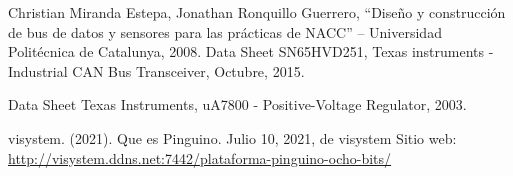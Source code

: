 \begin{thebibliography}{99}
 Christian Miranda Estepa, Jonathan Ronquillo Guerrero, “Diseño y construcción de bus de datos y sensores para las prácticas de NACC” – Universidad Politécnica de Catalunya, 2008.
 Data Sheet SN65HVD251, Texas instruments - Industrial CAN Bus Transceiver, Octubre, 2015. 

 Data Sheet Texas Instruments, uA7800 - Positive-Voltage Regulator, 2003. 

 visystem. (2021). Que es Pinguino. Julio 10, 2021, de visystem Sitio web: \url{ http://visystem.ddns.net:7442/plataforma-pinguino-ocho-bits/}

 
\end{thebibliography}